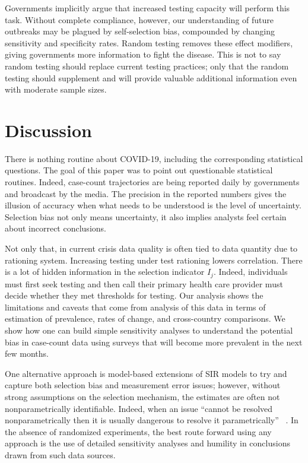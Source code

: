 \documentclass[aoas]{amsart}
\begin{document}
Governments implicitly argue that increased testing capacity will perform this task.  Without complete compliance, however, our understanding of future outbreaks may be plagued by self-selection bias, compounded by changing sensitivity and specificity rates.  Random testing removes these effect modifiers, giving governments more information to fight the disease.  This is not to say random testing should replace current testing practices; only that the random testing should supplement and will provide valuable additional information even with moderate sample sizes.

\section{Discussion}

There is nothing routine about COVID-19, including the corresponding statistical questions.  The goal of this paper was to point out questionable statistical routines.  Indeed, case-count trajectories are being reported daily by governments and broadcast by the media.  The precision in the reported numbers gives the illusion of accuracy when what needs to be understood is the level of uncertainty. Selection bias not only means uncertainty, it also implies analysts feel certain about incorrect conclusions.

Not only that, in current crisis data quality is often tied to data quantity due to rationing system.  Increasing testing under test rationing lowers correlation.  There is a lot of hidden information in the selection indicator $I_j$.  Indeed, individuals must first seek testing and then call their primary health care provider must decide whether they met thresholds for testing.  Our analysis shows the limitations and caveats that come from analysis of this data in terms of estimation of prevalence, rates of change, and cross-country comparisons.  We show how one can build simple sensitivity analyses to understand the potential bias in case-count data using surveys that will become more prevalent in the next few months.

One alternative approach is model-based extensions of SIR models to try and capture both selection bias and measurement error issues; however, without strong assumptions on the selection mechanism, the estimates are often not nonparametrically identifiable.  Indeed, when an issue ``cannot be resolved nonparametrically then it is usually dangerous to resolve it parametrically'' ~\cite[pp. 96]{CoxHink74}. In the absence of randomized experiments, the best route forward using any approach is the use of detailed sensitivity analyses and humility in conclusions drawn from such data sources.
\end{document}
